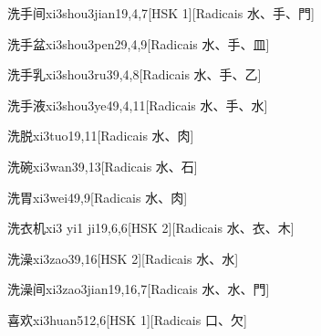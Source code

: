 \begin{entry}{洗手间}{xi3shou3jian1}{9,4,7}[HSK 1][Radicais ⽔、⼿、⾨]
\end{entry}

\begin{entry}{洗手盆}{xi3shou3pen2}{9,4,9}[Radicais ⽔、⼿、⽫]
\end{entry}

\begin{entry}{洗手乳}{xi3shou3ru3}{9,4,8}[Radicais ⽔、⼿、⼄]
\end{entry}

\begin{entry}{洗手液}{xi3shou3ye4}{9,4,11}[Radicais ⽔、⼿、⽔]
\end{entry}

\begin{entry}{洗脱}{xi3tuo1}{9,11}[Radicais ⽔、⾁]
\end{entry}

\begin{entry}{洗碗}{xi3wan3}{9,13}[Radicais ⽔、⽯]
\end{entry}

\begin{entry}{洗胃}{xi3wei4}{9,9}[Radicais ⽔、⾁]
\end{entry}

\begin{entry}{洗衣机}{xi3 yi1 ji1}{9,6,6}[HSK 2][Radicais ⽔、⾐、⽊]
\end{entry}

\begin{entry}{洗澡}{xi3zao3}{9,16}[HSK 2][Radicais ⽔、⽔]
\end{entry}

\begin{entry}{洗澡间}{xi3zao3jian1}{9,16,7}[Radicais ⽔、⽔、⾨]
\end{entry}

\begin{entry}{喜欢}{xi3huan5}{12,6}[HSK 1][Radicais ⼝、⽋]
\end{entry}

